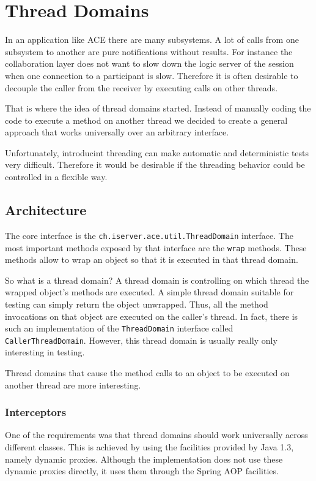 \chapter{Thread Domains}

In an application like ACE there are many subsystems. A lot of calls from
one subsystem to another are pure notifications without results. For instance
the collaboration layer does not want to slow down the logic server of the
session when one connection to a participant is slow. Therefore it is
often desirable to decouple the caller from the receiver by executing calls
on other threads.

That is where the idea of thread domains started. Instead of manually coding
the code to execute a method on another thread we decided to create a general
approach that works universally over an arbitrary interface.

Unfortunately, introducint threading can make automatic and deterministic
tests very difficult. Therefore it would be desirable if the threading
behavior could be controlled in a flexible way.


\section{Architecture}

The core interface is the \texttt{ch.iserver.ace.util.ThreadDomain} interface.
The most important methods exposed by that interface are the \texttt{wrap}
methods. These methods allow to wrap an object so that it is executed in
that thread domain.

So what is a thread domain? A thread domain is controlling on which thread
the wrapped object's methods are executed. A simple thread domain suitable
for testing can simply return the object unwrapped. Thus, all the method
invocations on that object are executed on the caller's thread. In fact, 
there is such an implementation of the \texttt{ThreadDomain} interface called
\texttt{CallerThreadDomain}. However, this thread domain is usually really
only interesting in testing.

Thread domains that cause the method calls to an object to be executed on
another thread are more interesting.


\subsection{Interceptors}
One of the requirements was that thread domains should work universally across
different classes. This is achieved by using the facilities provided by
Java 1.3, namely dynamic proxies. Although the implementation does not use
these dynamic proxies directly, it uses them through the Spring AOP facilities.

